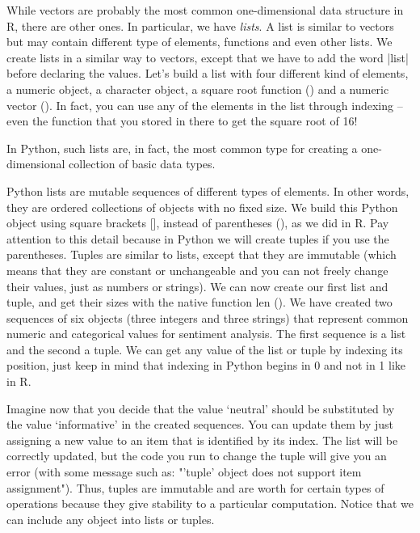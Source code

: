 


While vectors are probably the most common one-dimensional data
structure in R, there are other ones. In particular, we have
\emph{lists}. A list is similar to vectors but may contain different
type of elements, functions and even other lists. We create lists in a
similar way to vectors, except that we have to add the word |list|
before declaring the values. Let's build a list with four different
kind of elements, a numeric object, a character object, a square root
function () and a numeric vector (). In fact, you
can use any of the elements in the list through indexing -- even the
function  that you stored in there to get the square root of
16!




In Python, such lists are, in fact, the most common type for creating
a one-dimensional collection of basic data types. 

Python lists are mutable sequences of different types of elements. In other
words, they are ordered collections of objects with no fixed size. We
build this Python object using square brackets [], instead of
parentheses (), as we did in R. Pay attention to this detail because
in Python we will create tuples if you use the parentheses. Tuples are
similar to lists, except that they are immutable (which means that
they are constant or unchangeable and you can not freely change their
values, just as numbers or strings).  We can now create our first list
and tuple, and get their sizes with the native function len
(). We have created two sequences of six objects
(three integers and three strings) that represent common numeric and
categorical values for sentiment analysis. The first sequence is a
list and the second a tuple. We can get any value of the list or tuple
by indexing its position, just keep in mind that indexing in Python
begins in 0 and not in 1 like in R. 


Imagine now that you decide that the value `neutral' should be
substituted by the value `informative' in the created sequences. You
can update them by just assigning a new value to an item that is
identified by its index.  The list will be correctly updated, but the
code you run to change the tuple will give you an error (with some
message such as: "'tuple' object does not support item
assignment"). Thus, tuples are immutable and are worth for certain
types of operations because they give stability to a particular
computation. Notice that we can include any object into lists or
tuples.


